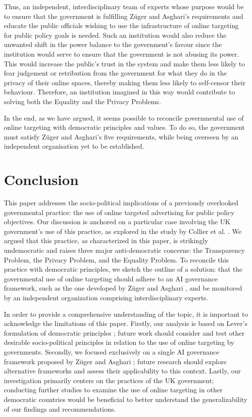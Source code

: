 \documentclass[preprint]{acmart}
\begin{document}
Thus, an independent, interdisciplinary team of experts whose purpose would be to ensure that the government is fulfilling Züger and Asghari's requirements and educate the public officials wishing to use the infrastructure of online targeting for public policy goals is needed. Such an institution would also reduce the unwanted shift in the power balance to the government's favour since the institution would serve to ensure that the government is not abusing its power. This would increase the public's trust in the system and make them less likely to fear judgement or retribution from the government for what they do in the privacy of their online spaces, thereby making them less likely to self-censor their behaviour. Therefore, an institution imagined in this way would contribute to solving both the Equality and the Privacy Problems. 

In the end, as we have argued, it seems possible to reconcile governmental use of online targeting with democratic principles and values. To do so, the government must satisfy Züger and Asghari's five requirements, while being overseen by an independent organisation yet to be established.


\section{Conclusion}

This paper addresses the socio-political implications of a previously overlooked governmental practice: the use of online targeted advertising for public policy objectives. Our discussion is anchored on a particular case involving the UK government's use of this practice, as explored in the study by Collier et al. \cite{Collier2022}. We argued that this practice, as characterized in this paper, is strikingly undemocratic and raises three major anti-democratic concerns: the Transparency Problem, the Privacy Problem, and the Equality Problem. To reconcile this practice with democratic principles, we sketch the outline of a solution: that the governmental use of online targeting should adhere to an AI governance framework, such as the one developed by Züger and Asghari \cite{zuger2022}, and be monitored by an independent organization comprising interdisciplinary experts.





In order to provide a comprehensive understanding of the topic, it is important to acknowledge the limitations of this paper. Firstly, our analysis is based on Lever's formulation of democratic principles \cite{lever2006}; future work should consider and test other desirable socio-political principles in relation to the use of online targeting by governments. Secondly, we focused exclusively on a single AI governance framework proposed by Züger and Asghari \cite{zuger2022}; future research should explore alternative frameworks and assess their applicability to this context. Lastly, our investigation primarily centers on the practices of the UK government; conducting further studies to examine the use of online targeting in other democratic countries would be beneficial to better understand the generalizability of our findings and recommendations.
\end{document}
